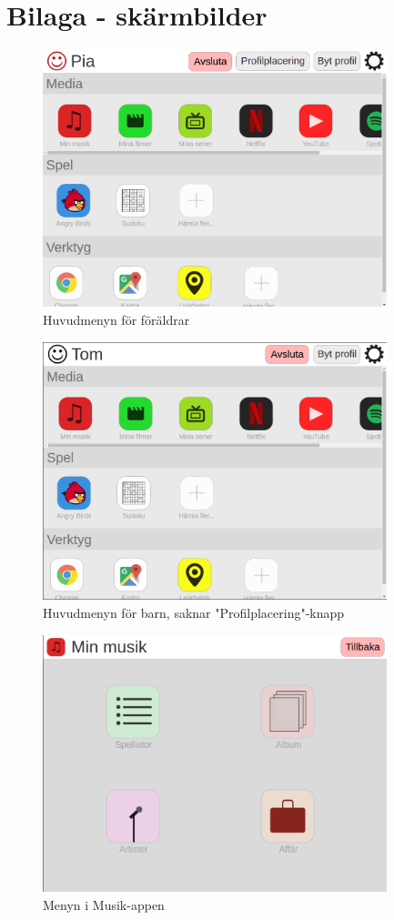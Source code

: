 \documentclass[a4paper,12pt,titlepage]{article}
\begin{document}
\newpage

\section*{Bilaga - skärmbilder}

\begin{figure}[h]
    \centering
    \includegraphics[width=10cm]{../screenshots/main_menu_pia.png}
    \caption{Huvudmenyn för föräldrar}
\end{figure}

\begin{figure}[h]
    \centering
    \includegraphics[width=10cm]{../screenshots/main_menu_tom.png}
    \caption{Huvudmenyn för barn, saknar "Profilplacering"-knapp}
\end{figure}

\begin{figure}[h]
    \centering
    \includegraphics[width=10cm]{../screenshots/music.png}
    \caption{Menyn i Musik-appen}
\end{figure}
\end{document}
